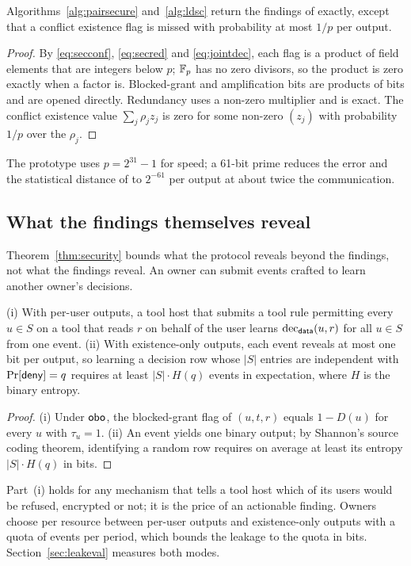 \begin{proposition}[Correctness]\label{prop:correct}
Algorithms~\ref{alg:pairsecure} and~\ref{alg:ldsc} return the findings of  exactly, except that a conflict existence flag is missed with probability at most $1/p$ per output.
\end{proposition}
\begin{proof}
By \eqref{eq:secconf}, \eqref{eq:secred} and \eqref{eq:jointdec}, each flag is a product of field elements that are integers below $p$; $\mathbb{F}_p$ has no zero divisors, so the product is zero exactly when a factor is. Blocked-grant and amplification bits are products of bits and are opened directly. Redundancy uses a non-zero multiplier and is exact. The conflict existence value $\sum_j \rho_j z_j$ is zero for some non-zero $(z_j)$ with probability $1/p$ over the $\rho_j$.
\end{proof}
The prototype uses $p = 2^{31}-1$ for speed; a 61-bit prime reduces the error and the statistical distance of  to $2^{-61}$ per output at about twice the communication.

\subsection{What the findings themselves reveal}\label{sec:outputleak}
Theorem~\ref{thm:security} bounds what the protocol reveals beyond the findings, not what the findings reveal. An owner can submit events crafted to learn another owner's decisions.

\begin{proposition}[Probing]\label{prop:probe}
(i) With per-user outputs, a tool host that submits a tool rule permitting every $u \in S$ on a tool that reads $r$ on behalf of the user learns $\mathrm{dec}_{\mathsf{data}}(u, r)$ for all $u \in S$ from one event. (ii) With existence-only outputs, each event reveals at most one bit per output, so learning a decision row whose $|S|$ entries are independent with $\Pr[\mathsf{deny}] = q$ requires at least $|S| \cdot H(q)$ events in expectation, where $H$ is the binary entropy.
\end{proposition}
\begin{proof}
(i) Under $\mathsf{obo}$, the blocked-grant flag of $(u, t, r)$ equals $1 - D(u)$ for every $u$ with $\tau_u = 1$. (ii) An event yields one binary output; by Shannon's source coding theorem, identifying a random row requires on average at least its entropy $|S| \cdot H(q)$ in bits.
\end{proof}
Part~(i) holds for any mechanism that tells a tool host which of its users would be refused, encrypted or not; it is the price of an actionable finding. Owners choose per resource between per-user outputs and existence-only outputs with a quota of events per period, which bounds the leakage to the quota in bits. Section~\ref{sec:leakeval} measures both modes.

